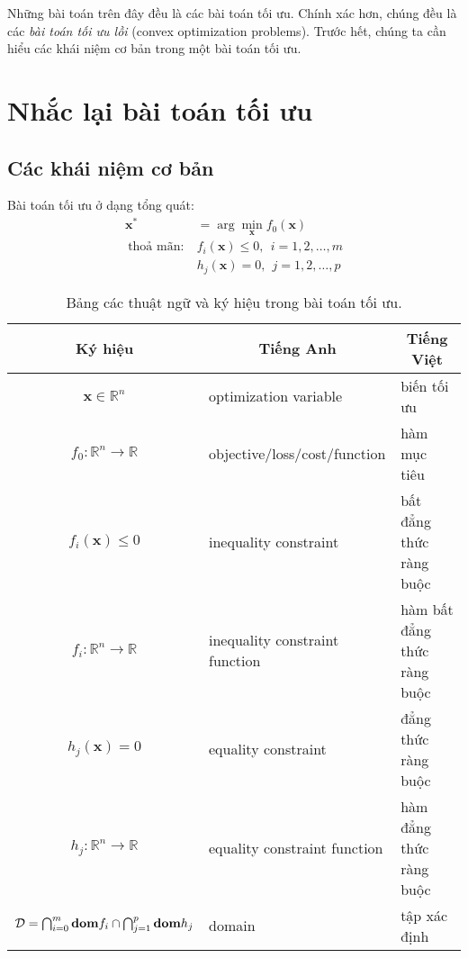 
Những bài toán trên đây đều là các bài toán tối ưu. Chính xác hơn, chúng đều
là các \textit{bài toán tối ưu lồi} ({convex optimization problems}). Trước hết, chúng ta cần hiểu các khái niệm cơ bản trong một bài toán tối ưu. 
 
 
\section{Nhắc lại bài toán tối ưu}
 
\subsection{Các khái niệm cơ bản}
Bài toán tối ưu ở dạng tổng quát:  
\begin{equation} 
\label{eqn:17_optprob1}
\begin{aligned}
\mathbf{x}^* &= \arg\min_{\mathbf{x}} f_0(\mathbf{x}) \\\ 
\text{thoả mãn:}~ & f_i(\mathbf{x}) \leq 0, ~~ i = 1, 2, \dots,m \\\ 
& h_j(\mathbf{x}) = 0, ~~ j = 1, 2, \dots, p 
\end{aligned}
\end{equation} 
 

 

 \begin{table}[t]
\centering
\caption{Bảng các thuật ngữ và ký hiệu trong bài toán tối ưu.}
\label{tab:17_terms}
\setlength{\tabcolsep}{0.5em}
{\small {}
\begin{tabular}{|c|l|l|}
\hline
\multicolumn{1}{|c|}{\textbf{Ký hiệu}} & \multicolumn{1}{c|}{\textbf{Tiếng Anh}}
& \multicolumn{1}{c|}{\textbf{Tiếng Việt}} \\ \hline \hline 
 $\mathbf{x} \in \mathbb{R}^n$   & optimization variable                   & biến tối ưu                              \\ \hline
$f_0: \mathbb{R}^n \rightarrow \mathbb{R}$  & objective/loss/cost/function            & hàm mục tiêu                             \\ \hline
$f_i(\mathbf{x}) \leq 0 $  & inequality constraint                   & bất đẳng thức ràng buộc                  \\ \hline
 $f_i: \mathbb{R}^n \rightarrow \mathbb{R}$  & inequality constraint function          & hàm bất đẳng thức ràng buộc              \\ \hline
$h_j(\mathbf{x}) = 0 $   & equality constraint                     & đẳng thức ràng buộc                      \\ \hline
$h_j: \mathbb{R}^n \rightarrow \mathbb{R}$   & equality constraint function            & hàm đẳng thức ràng buộc                  \\ \hline
 $\mathcal{D} = \bigcap_{i=0}^m \text{\bf dom}f_i \cap \bigcap_{j=1}^p \text{\bf dom}h_j $  & domain                                  & tập xác định                             \\ \hline
\end{tabular}}
\end{table}

